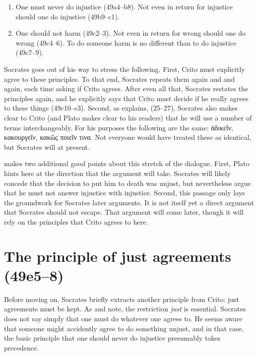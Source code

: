 \documentclass[11pt]{article}
\begin{document}
\begin{enumerate}
    \item One must never do injustice (49a4--b8).  Not even in return for injustice should one do injustice (49b9--c1).
    \item One should not harm (49c2--3).  Not even in return for wrong should one do wrong (49c4--6).  To do someone harm is no different than to do injustice (49c7--9).
\end{enumerate}

Socrates goes out of his way to stress the following.  First, Crito must explicitly agree to these principles.  To that end, Socrates repeats them again and and again, each time asking if Crito agrees.  After even all that, Socrates restates the principles again, and he explicitly says that Crito must decide if he really agrees to these things (49c10--e3).  Second, as \citet{kraut1984} explains, (25--27), Socrates also makes clear to Crito (and Plato makes clear to his readers) that he will use a number of terms interchangeably.  For his purposes the following are the same: ἀδικεῖν, κακουργεῖν, κακῶς ποιεῖν τινα.  Not everyone would have treated these as identical, but Socrates will at present.

\citet{kraut1984} makes two additional good points about this stretch of the dialogue.  First, Plato hints here at the direction that the argument will take. Socrates will likely concede that the decision to put him to death was unjust, but nevertheless argue that he must not answer injustice with injustice.  Second, this passage only lays the groundwork for Socrates later arguments.  It is not itself yet a direct argument that Socrates should not escape.  That argument will come later, though it will rely on the principles that Crito agrees to here.

\section{The principle of just agreements (49e5--8)}

Before moving on, Socrates briefly extracts another principle from Crito: just agreements must be kept.  As \citet{kraut1984} and \citet{brickhouse2004} note, the restriction \emph{just} is essential.  Socrates does not say simply that one must do whatever one agrees to.  He seems aware that someone might accidently agree to do something unjust, and in that case, the basic principle that one should never do injustice presumably takes precedence.
\end{document}
